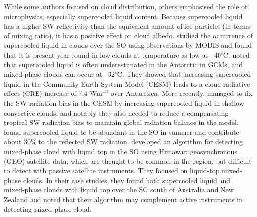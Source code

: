 While some authors focused on cloud distribution, others
emphasised the role of microphysics, especially supercooled liquid content.
Because supercooled liquid has a higher SW reflectivity than the equivalent amount
of ice particles (in terms of mixing ratio), it has a positive effect on cloud albedo.
\cite{morrison2011} studied the occurrence of supercooled liquid in clouds
over the SO using observations by MODIS and
found that it is present year-round in low clouds at temperature as low as
--40$^{\circ}$C.
\cite{lawson2014} noted that supercooled liquid is often
underestimated in the Antarctic in GCMs, and mixed-phase clouds can occur at
--32$^{\circ}$C.
They showed that increasing supercooled liquid in the
Community Earth System Model (CESM) leads to a cloud radiative effect (CRE)
increase of 7.4 Wm$^{-2}$ over Antarctica. More recently, \cite{kay2016}
managed to fix the SW radiation bias in the CESM by increasing supercooled liquid
in shallow convective clouds, and notably they also needed to reduce a
compensating tropical SW radiation bias to maintain global radiation balance
in the model.
\cite{bodas-salcedo2016} found supercooled liquid to be abundant in
the SO in summer and contribute about 30\% to the reflected
SW radiation.
\cite{noh2019} developed an algorithm for detecting mixed-phase cloud with
liquid top in the SO using Himawari geosynchronous (GEO) satellite data, which are thought
to be common in the region, but difficult to detect with passive satellite
instruments. They focused on liquid‐top mixed‐phase clouds. In their case studies, they found both supercooled liquid
and mixed-phase clouds with liquid top over the SO south of Australia and
New Zealand and noted that their algorithm may complement active instruments
in detecting mixed-phase cloud.


